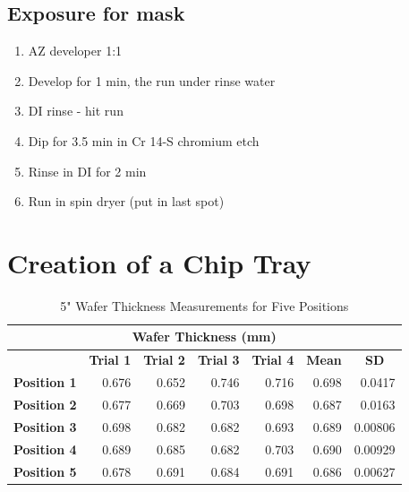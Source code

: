 \documentclass[12pt]{article}
\numberwithin{equation}{section}
\numberwithin{table}{section}
\numberwithin{figure}{section}
\begin{document}
\subsection{Exposure for mask}

\begin{enumerate}
\item AZ developer 1:1
\item Develop for 1 min, the run under rinse water
\item DI rinse - hit run
\item Dip for 3.5 min in Cr 14-S chromium etch
\item Rinse in DI for 2 min
\item Run in spin dryer (put in last spot)
\end{enumerate}
 

\section{Creation of a Chip Tray} 

\begin{table}[]
\centering
\caption{5" Wafer Thickness Measurements for Five Positions}\label{Thickness}
\begin{tabular}{@{}crrrrrr@{}}
\toprule
\multicolumn{7}{c}{\textbf{Wafer Thickness (mm)}}                                                                                                                                                                                                                           \\ \midrule
                    & \multicolumn{1}{c}{\textbf{Trial 1}} & \multicolumn{1}{c}{\textbf{Trial 2}} & \multicolumn{1}{c}{\textbf{Trial 3}} & \multicolumn{1}{c}{\textbf{Trial 4}} & \multicolumn{1}{c}{\textbf{Mean}} & \multicolumn{1}{c}{\textbf{SD}} \\
\textbf{Position 1} & 0.676 & 0.652 & 0.746 & 0.716 & 0.698 & 0.0417 \\
\textbf{Position 2} & 0.677 & 0.669 & 0.703 & 0.698 & 0.687 & 0.0163 \\
\textbf{Position 3} & 0.698 & 0.682 & 0.682 & 0.693 & 0.689 & 0.00806 \\
\textbf{Position 4} & 0.689 & 0.685 & 0.682 & 0.703 & 0.690 & 0.00929 \\
\textbf{Position 5} & 0.678 & 0.691 & 0.684 & 0.691 & 0.686 & 0.00627 \\ \bottomrule
\end{tabular}

\end{table}
\end{document}
